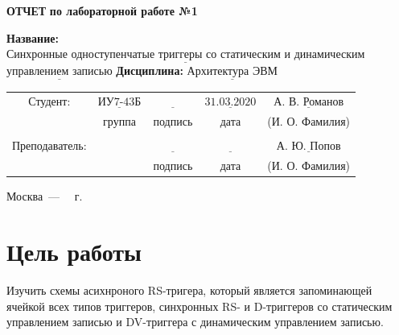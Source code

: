 \documentclass[a4paper,12pt]{article}
\begin{document}
\begin{center}
	\noindent\begin{minipage}{1.3\textwidth}\centering
	\Large\textbf{  ОТЧЕТ }\newline
	\textbf{по лабораторной работе №1}\newline\newline
	\end{minipage}
\end{center}

\noindent\textbf{Название:} $\underline{\text{Синхронные одноступенчатые триггеры со статическим и динамическим}}$\newline
\noindent$\underline{\text{управлением записью}}$\newline\newline
\noindent\textbf{Дисциплина:} $\underline{\text{Архитектура ЭВМ}}$\newline\newline\newline\newline\newline

\begin{center}
	\begin{tabular}{ccccc}
		Студент: & $\underline{\text{ИУ7-43Б}}$ & $\underline{\text{~~~~~~~~~~~}}$ & $\underline{\text{31.03.2020}}$ & $\underline{\text{А. В. Романов}}$ \\
		 & \footnotesize группа & \footnotesize подпись & \footnotesize дата  & \footnotesize (И. О. Фамилия) \\
		  &  &  &  & \\
		Преподаватель: & \textbf{} & $\underline{\text{~~~~~~~~~~~}}$ & $\underline{\text{~~~~~~~~~~~~}}$ & $\underline{\text{А. Ю. Попов}}$ \\
		&  & \footnotesize подпись & \footnotesize дата  & \footnotesize (И. О. Фамилия) \\
	\end{tabular}
\end{center}


\begin{center}
	\vfill
	Москва~---~\the\year
~г.
\end{center}
\clearpage


\section{Цель работы} Изучить схемы асихнроного RS-тригера, который является запоминающей ячейкой всех типов триггеров, синхронных RS- и D-триггеров со статическим управлением записью и DV-триггера с динамическим управлением записью.
\end{document}

